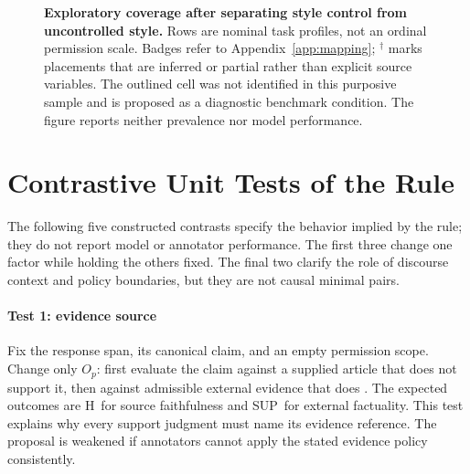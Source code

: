 \documentclass{clv2025}
\newcommand{\Hall}{\textsc{H}}
\newcommand{\SUP}{\textsc{SUP}}
\begin{document}
\begin{figure}[t]
{}
\caption{\textbf{Exploratory coverage after separating style control from
uncontrolled style.}
Rows are nominal task profiles, not an ordinal permission scale.
Badges refer to Appendix~\ref{app:mapping}; $^\dagger$ marks placements
that are inferred or partial rather than explicit source variables.
The outlined cell was not identified in this purposive sample and is
proposed as a diagnostic benchmark condition.
The figure reports neither prevalence nor model performance.}
\label{fig:profiles}
\end{figure}
\FloatBarrier

\section{Contrastive Unit Tests of the Rule}\label{sec:cases}

The following five constructed contrasts specify the behavior implied by
the rule; they do not report model or annotator performance.
The first three change one factor while holding the others fixed.
The final two clarify the role of discourse context and policy boundaries,
but they are not causal minimal pairs.

\paragraph{Test 1: evidence source}
Fix the response span, its canonical claim, and an empty permission scope.
Change only $O_p$: first evaluate the claim against a supplied article
that does not support it, then against admissible external evidence that
does \citep{maynez_faithfulness_2020}.
The expected outcomes are \Hall\ for source faithfulness and \SUP\ for
external factuality.
This test explains why every support judgment must name its evidence
reference.
The proposal is weakened if annotators cannot apply the stated evidence
policy consistently.
\end{document}
